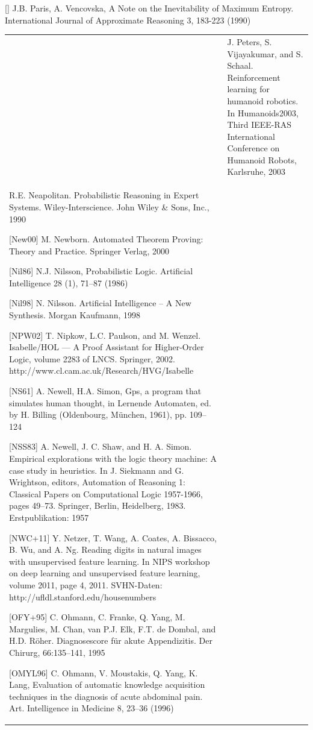 \documentclass[10pt]{book}
\begin{document}
[\cite{paris1990maxent}] J.B. Paris, A. Vencovska, A Note on the Inevitability of Maximum Entropy. International Journal of Approximate Reasoning 3, 183-223 (1990)
\begin{tabular}{|l|l|}
\hline [\cite{peters2003humanoid}] & J. Peters, S. Vijayakumar, and S. Schaal. Reinforcement learning for humanoid robotics. In Humanoids2003, Third IEEE-RAS International Conference on Humanoid Robots, Karlsruhe, 2003 \\
\newpage
[Nea90] R.E. Neapolitan. Probabilistic Reasoning in Expert Systems. Wiley-Interscience. John Wiley \& Sons, Inc., 1990

[New00] M. Newborn. Automated Theorem Proving: Theory and Practice. Springer Verlag, 2000

[Nil86] N.J. Nilsson, Probabilistic Logic. Artificial Intelligence 28 (1), 71–87 (1986)

[Nil98] N. Nilsson. Artificial Intelligence – A New Synthesis. Morgan Kaufmann, 1998

[NPW02] T. Nipkow, L.C. Paulson, and M. Wenzel. Isabelle/HOL — A Proof Assistant for Higher-Order Logic, volume 2283 of LNCS. Springer, 2002. http://www.cl.cam.ac.uk/Research/HVG/Isabelle

[NS61] A. Newell, H.A. Simon, Gps, a program that simulates human thought, in Lernende Automaten, ed. by H. Billing (Oldenbourg, München, 1961), pp. 109–124

[NSS83] A. Newell, J. C. Shaw, and H. A. Simon. Empirical explorations with the logic theory machine: A case study in heuristics. In J. Siekmann and G. Wrightson, editors, Automation of Reasoning 1: Classical Papers on Computational Logic 1957-1966, pages 49–73. Springer, Berlin, Heidelberg, 1983. Erstpublikation: 1957

[NWC+11] Y. Netzer, T. Wang, A. Coates, A. Bissacco, B. Wu, and A. Ng. Reading digits in natural images with unsupervised feature learning. In NIPS workshop on deep learning and unsupervised feature learning, volume 2011, page 4, 2011. SVHN-Daten: http://ufldl.stanford.edu/housenumbers

[OFY+95] C. Ohmann, C. Franke, Q. Yang, M. Margulies, M. Chan, van P.J. Elk, F.T. de Dombal, and H.D. Röher. Diagnosescore für akute Appendizitis. Der Chirurg, 66:135–141, 1995

[OMYL96] C. Ohmann, V. Moustakis, Q. Yang, K. Lang, Evaluation of automatic knowledge acquisition techniques in the diagnosis of acute abdominal pain. Art. Intelligence in Medicine 8, 23–36 (1996)


\end{tabular}
\end{document}
